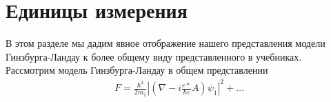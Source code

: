 \chapter{Единицы измерения}

В этом разделе мы дадим явное отображение нашего представления модели 
Гинзбурга-Ландау к более общему виду представленного в учебниках. 
Рассмотрим модель Гинзбурга-Ландау в общем представлении
\begin{align*}
	F = \frac{\hbar^2}{2m_1}\left| 
		\left( \nabla - i\frac{e*}{\hbar c}A \right)\psi_1\right|^2 + 
		\ldots 
\end{align*}
